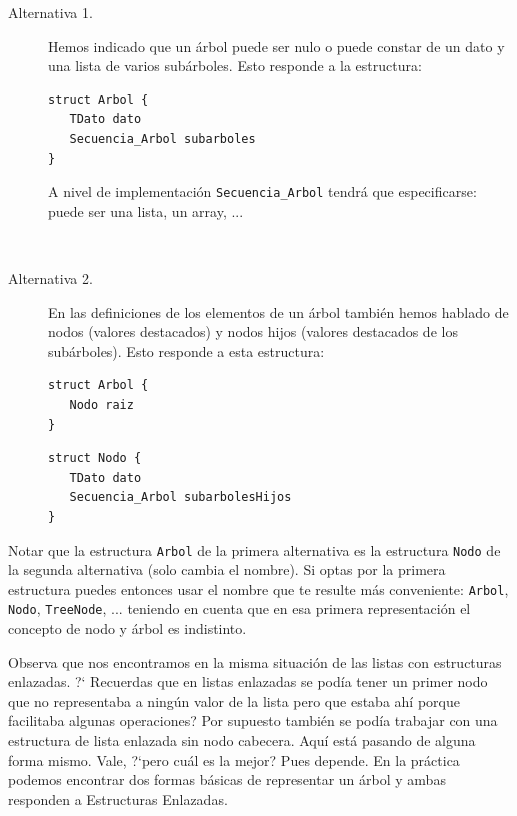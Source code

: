 \begin{description}
\item[Alternativa 1.] Hemos indicado que un árbol puede ser nulo o puede constar de un dato y una lista de varios subárboles. Esto responde a la estructura:

\hfil
\begin{minipage}{.4\textwidth}
\begin{Verbatim}[frame=single]
struct Arbol {
   TDato dato
   Secuencia_Arbol subarboles
}
\end{Verbatim}
\end{minipage}


A nivel de implementación {\tt Secuencia\_Arbol} tendrá que especificarse: puede ser una lista, un array, ...

\


\item[Alternativa 2.]
En las definiciones de los elementos de un árbol también hemos hablado de nodos (valores destacados) y nodos hijos (valores destacados de los subárboles). Esto responde a esta estructura:

\hfil
\begin{minipage}{.4\textwidth}
\begin{Verbatim}[frame=single]
struct Arbol {
   Nodo raiz
}
\end{Verbatim}
\end{minipage}
\begin{minipage}{.4\textwidth}
\begin{Verbatim}[frame=single]
struct Nodo {
   TDato dato
   Secuencia_Arbol subarbolesHijos
}
\end{Verbatim}
\end{minipage}
\end{description}


Notar que la estructura {\tt Arbol} de la primera alternativa es la  estructura {\tt Nodo} de la segunda alternativa (solo cambia el nombre). Si optas por la primera estructura puedes entonces usar el nombre que te resulte más conveniente: {\tt Arbol}, {\tt Nodo}, {\tt TreeNode}, ... teniendo en cuenta que en esa primera representación el concepto de nodo y árbol es indistinto.


Observa que nos encontramos en la misma situación de las listas con estructuras enlazadas. ?` Recuerdas que en listas enlazadas se podía tener un primer nodo que no representaba a ningún valor de la lista pero que estaba ahí porque facilitaba algunas operaciones? Por supuesto también se podía trabajar con una estructura de lista enlazada sin nodo cabecera.  Aquí está pasando de alguna forma mismo.
Vale, ?`pero cuál es la mejor? Pues depende. En la práctica  podemos encontrar dos formas básicas de representar un árbol y  ambas responden a Estructuras Enlazadas.

